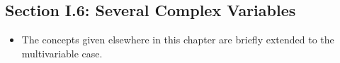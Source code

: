 \documentclass[../notes.tex]{subfiles}
\begin{document}
\subsection*{Section I.6: Several Complex Variables}
\begin{itemize}
    \item The concepts given elsewhere in this chapter are briefly extended to the multivariable case.
\end{itemize}
\end{document}
